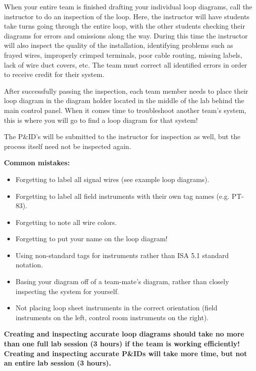When your entire team is finished drafting your individual loop diagrams, call the instructor to do an inspection of the loop.  Here, the instructor will have students take turns going through the entire loop, with the other students checking their diagrams for errors and omissions along the way.  During this time the instructor will also inspect the quality of the installation, identifying problems such as frayed wires, improperly crimped terminals, poor cable routing, missing labels, lack of wire duct covers, etc.  The team must correct all identified errors in order to receive credit for their system.  

After successfully passing the inspection, each team member needs to place their loop diagram in the diagram holder located in the middle of the lab behind the main control panel.  When it comes time to troubleshoot another team's system, this is where you will go to find a loop diagram for that system!

The P\&ID's will be submitted to the instructor for inspection as well, but the process itself need not be inspected again.

\vskip 10pt

{\bf Common mistakes:}

\begin{itemize}
\item{} Forgetting to label all signal wires (see example loop diagrams).
\item{} Forgetting to label all field instruments with their own tag names (e.g. PT-83).
\item{} Forgetting to note all wire colors.
\item{} Forgetting to put your name on the loop diagram!
\item{} Using non-standard tags for instruments rather than ISA 5.1 standard notation.
\item{} Basing your diagram off of a team-mate's diagram, rather than closely inspecting the system for yourself.
\item{} Not placing loop sheet instruments in the correct orientation (field instruments on the left, control room instruments on the right).
\end{itemize}

\vskip 10pt

{\bf Creating and inspecting accurate loop diagrams should take no more than one full lab session (3 hours) if the team is working efficiently!  Creating and inspecting accurate P\&IDs will take more time, but not an entire lab session (3 hours).}







